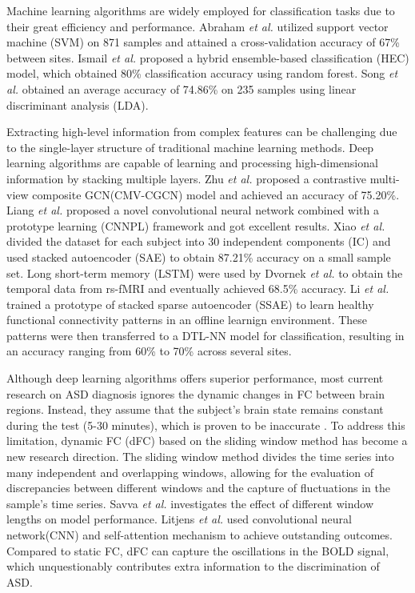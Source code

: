 \documentclass[journal,twoside,web]{ieeecolor}
\begin{document}
Machine learning algorithms are widely employed for classification tasks due to their great efficiency and performance\cite{nogay2020machine}. Abraham \textit{et al.} utilized support vector machine (SVM) on 871 samples and attained a cross-validation accuracy of 67\% between sites\cite{abraham2017deriving}.  Ismail \textit{et al.} proposed a hybrid ensemble-based classification (HEC) model, which obtained 80\% classification accuracy using random forest\cite{ismail2022hec}. Song \textit{et al.} obtained an average accuracy of 74.86\% on 235 samples using linear discriminant analysis (LDA)\cite{song2019characterizing}.

Extracting high-level information from complex features can be challenging due to the single-layer structure of traditional machine learning methods. Deep learning algorithms are capable of learning and processing high-dimensional information by stacking multiple layers. Zhu \textit{et al.} proposed a contrastive multi-view composite GCN(CMV-CGCN) model and achieved an accuracy of 75.20\%\cite{zhu2022contrastive}. Liang \textit{et al.} proposed a novel convolutional neural network combined with a prototype learning (CNNPL) framework and got excellent results\cite{liang2021convolutional}. Xiao \textit{et al.} divided the dataset for each subject into 30 independent components (IC) and used stacked autoencoder (SAE) to obtain 87.21\% accuracy on a small sample set\cite{xiao2018sae}. Long short-term memory (LSTM) were used by Dvornek \textit{et al.}  to obtain the temporal data from rs-fMRI and eventually achieved 68.5\% accuracy\cite{dvornek2017identifying}. Li \textit{et al.} trained a  prototype of stacked sparse autoencoder (SSAE) to learn healthy functional connectivity patterns in an offline learnign environment. These patterns were then transferred to a DTL-NN model for classification, resulting in an accuracy ranging from 60\% to 70\% across several sites\cite{li2018novel}.

Although deep learning algorithms offers superior performance, most current research on ASD diagnosis ignores the dynamic changes in FC between brain regions. Instead, they assume that the subject's brain state remains constant during the test (5-30 minutes), which is proven to be inaccurate \cite{calhoun2014chronnectome, allen2014tracking, rabany2019dynamic, cai2018capturing}. To address this limitation, dynamic FC (dFC) based on the sliding window method has become a new research direction. The sliding window method divides the time series into many independent and overlapping windows, allowing for the evaluation of discrepancies between different windows and the capture of fluctuations in the sample's time series. Savva \textit{et al.} investigates the effect of different window lengths on model performance\cite{savva2019assessment}. Litjens \textit{et al.} used convolutional neural network(CNN) and self-attention mechanism to achieve outstanding outcomes\cite{litjens2017survey}. Compared to static FC, dFC can capture the oscillations in the BOLD signal, which unquestionably contributes extra information to the discrimination of ASD.
\end{document}
